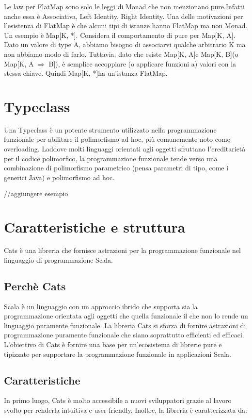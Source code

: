 \noindent Le law per FlatMap sono solo le leggi di Monad che non menzionano pure.Infatti anche essa è Associativa, Left Identity, Right Identity. Una delle motivazioni per l'esistenza di FlatMap è che alcuni tipi di istanze hanno FlatMap ma non Monad. Un esempio è Map[K, *]. Considera il comportamento di pure per Map[K, A]. Dato un valore di type A, abbiamo bisogno di associarvi qualche arbitrario K ma non abbiamo modo di farlo. Tuttavia, dato che esiste Map[K, A]e Map[K, B](o Map[K, A $\Rightarrow$ B]), è semplice accoppiare (o applicare funzioni a) valori con la stessa chiave. Quindi Map[K, *]ha un'istanza FlatMap.



\section{Typeclass}
Una Typeclass è un potente strumento utilizzato nella programmazione funzionale per abilitare il polimorfismo ad hoc, più comunemente noto come overloading. Laddove molti linguaggi orientati agli oggetti sfruttano l'ereditarietà per il codice polimorfico, la programmazione funzionale tende verso una combinazione di polimorfismo parametrico (pensa parametri di tipo, come i generici Java) e polimorfismo ad hoc.

//aggiungere esempio




\section{Caratteristiche e struttura}
Cats è una libreria che fornisce astrazioni per la programmazione funzionale nel linguaggio di programmazione Scala. 

\subsection{Perchè Cats}
Scala è un linguaggio con un approccio ibrido che supporta sia la programmazione orientata agli oggetti che quella funzionale il che non lo rende un linguaggio puramente funzionale. La libreria Cats si sforza di fornire astrazioni di programmazione puramente funzionale che siano soprattutto efficienti ed efficaci. L’obiettivo di Cats è fornire una base per un’ecosistema di librerie pure e tipizzate per supportare la programmazione funzionale in applicazioni Scala.

\subsection{Caratteristiche}
In primo luogo, Cats è molto accessibile a nuovi sviluppatori grazie al lavoro svolto per renderla intuitiva e user-friendly. Inoltre, la libreria è caratterizzata da:

